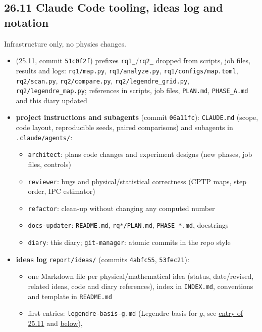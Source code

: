 \subsection*{26.11 \quad Claude Code tooling, ideas log and notation}
\label{sec:tooling}
\begin{sloppypar}
Infrastructure only, no physics changes.
\begin{itemize}
    \item (25.11, commit \texttt{51c0f2f}) prefixes \texttt{rq1\_}/\texttt{rq2\_} dropped from scripts, job files,
    results and logs: \texttt{rq1/map.py}, \texttt{rq1/analyze.py}, \texttt{rq1/configs/map.toml},
    \texttt{rq2/scan.py}, \texttt{rq2/compare.py}, \texttt{rq2/legendre\_grid.py}, \texttt{rq2/legendre\_map.py};
    references in scripts, job files, \texttt{PLAN.md}, \texttt{PHASE\_A.md} and this diary updated
    \item \textbf{project instructions and subagents} (commit \texttt{06a11fc}): \texttt{CLAUDE.md} (scope, code
    layout, reproducible seeds, paired comparisons) and subagents in \texttt{.claude/agents/}:
    \begin{itemize}
        \item \texttt{architect}: plans code changes and experiment designs (new phases, job files, controls)
        \item \texttt{reviewer}: bugs and physical/statistical correctness (CPTP maps, step order, IPC estimator)
        \item \texttt{refactor}: clean-up without changing any computed number
        \item \texttt{docs-updater}: \texttt{README.md}, \texttt{rq*/PLAN.md}, \texttt{PHASE\_*.md}, docstrings
        \item \texttt{diary}: this diary; \texttt{git-manager}: atomic commits in the repo style
    \end{itemize}
    \item \textbf{ideas log} \texttt{report/ideas/} (commits \texttt{4abfc55}, \texttt{53fec21}):
    \begin{itemize}
        \item one Markdown file per physical/mathematical idea (status, date/revised, related ideas, code and diary
        references), index in \texttt{INDEX.md}, conventions and template in \texttt{README.md}
        \item first entries: \texttt{legendre-basis-g.md} (Legendre basis for $g$, see
        \hyperref[sec:rq2-legendre-plan]{entry of 25.11} and \hyperref[sec:rq2-optimal-shapes]{below}),

\end{itemize}
\end{itemize}
\end{sloppypar}
